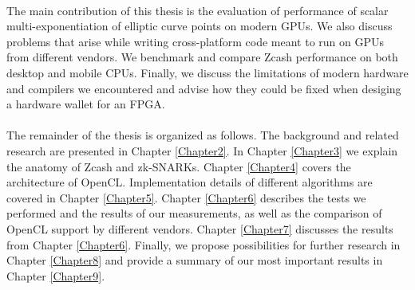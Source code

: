 \\
The main contribution of this thesis is the evaluation of performance of scalar multi-exponentiation of elliptic curve points on modern GPUs. We also discuss problems that arise while writing cross-platform code meant to run on GPUs from different vendors. We benchmark and compare Zcash performance on both desktop and mobile CPUs. Finally, we discuss the limitations of modern hardware and compilers we encountered and advise how they could be fixed when desiging a hardware wallet for an FPGA.\\
\\
The remainder of the thesis is organized as follows. The background and related research are presented in Chapter \ref{Chapter2}. In Chapter \ref{Chapter3} we explain the anatomy of Zcash and zk-SNARKs. Chapter \ref{Chapter4} covers the architecture of OpenCL. Implementation details of different algorithms are covered in Chapter \ref{Chapter5}. Chapter \ref{Chapter6} describes the tests we performed and the results of our measurements, as well as the comparison of OpenCL support by different vendors. Chapter \ref{Chapter7} discusses the results from Chapter \ref{Chapter6}. Finally, we propose possibilities for further research in Chapter \ref{Chapter8} and provide a summary of our most important results in Chapter \ref{Chapter9}.
